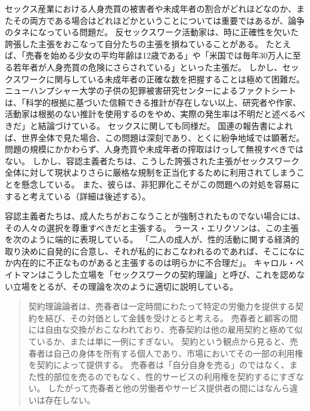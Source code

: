 \documentclass[paper=a4,book,openany]{jlreq} \usepackage{mystyle}
\begin{document}
セックス産業における人身売買の被害者や未成年者の割合がどれほどなのか、またその両方である場合はどれほどかということについては重要ではあるが、論争のタネになっている問題だ。
反セックスワーク活動家は、時に正確性を欠いた誇張した主張をおこなって自分たちの主張を損ねていることがある。
たとえば、「売春を始める少女の平均年齢は12歳である」や「米国では毎年30万人に至る若年者が人身売買の危険にさらされている」といった主張だ\citep{hall14:_is_one_most_cited_statis}。
しかし、セックスワークに関与している未成年者の正確な数を把握することは極めて困難だ。
ニューハンプシャー大学の子供の犯罪被害研究センターによるファクトシートは、「科学的根拠に基づいた信頼できる推計が存在しない以上、研究者や作家、活動家は根拠のない推計を使用するのをやめ、実際の発生率は不明だと述べるべきだ」と結論づけている\citep{children08:_sex_traff_minor}。
セックスに関しても同様だ。
国連の報告書によれば、世界全体で見た場合、この問題は深刻であり、とくに紛争地域では顕著だ\citep{drugs18:_global_repor_traff_person}。
問題の規模にかかわらず、人身売買や未成年者の搾取はけっして無視すべきではない。
しかし、容認主義者たちは、こうした誇張された主張がセックスワーク全体に対して現状よりさらに厳格な規制を正当化するために利用されてしまうことを懸念している。
また、彼らは、非犯罪化こそがこの問題への対処を容易にすると考えている（詳細は後述する）。

容認主義者たちは、成人たちがおこなうことが強制されたものでない場合には、その人々の選択を尊重すべきだと主張する。
ラース・エリクソンは、この主張を次のように端的に表現している。
「二人の成人が、性的活動に関する経済的取り決めに自発的に合意し、それが私的におこなわれるのであれば、そこになにか内在的に不正なものがあると主張するのは明らかに不合理だ」\citep[pp.338--339]{ericsson80:_charg_again_prost}。
キャロル・ペイトマンはこうした立場を「セックスワークの契約理論」と呼び、これを認めない立場をとるが、その理論を次のように適切に説明している。

\begin{quote}
契約理論論者は、売春者は一定時間にわたって特定の労働力を提供する契約を結び、その対価として金銭を受けとると考える。
売春者と顧客の間には自由な交換がおこなわれており、売春契約は他の雇用契約と極めて似ているか、または単に一例にすぎない。
契約という観点から見ると、売春者は自己の身体を所有する個人であり、市場においてその一部の利用権を契約によって提供する。
売春者は「自分自身を売る」のではなく、また性的部位を売るのでもなく、性的サービスの利用権を契約するにすぎない。
したがって売春者と他の労働者やサービス提供者の間にはなんら違いは存在しない。
\citep[p.191]{pateman88:_sexual_contr}
\end{quote}
\end{document}
